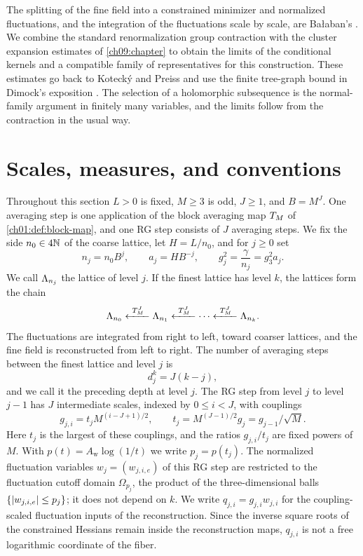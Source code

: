 The splitting of the fine field into a constrained minimizer and normalized fluctuations, and the integration of the fluctuations scale by scale, are Bałaban's \cite{Balaban1985Variational,Balaban1985UV,Balaban1988Convergent}. We combine the standard renormalization group contraction with the cluster expansion estimates of \cref{ch09:chapter} to obtain the limits of the conditional kernels and a compatible family of representatives for this construction. These estimates go back to Kotecký and Preiss \cite{KoteckyPreiss1986} and use the finite tree-graph bound in Dimock's exposition \cite[Appendix~B]{Dimock2013v2}. The selection of a holomorphic subsequence is the normal-family argument in finitely many variables, and the limits follow from the contraction in the usual way.

\section{Scales, measures, and conventions}\label{ch12:sec:setup}

Throughout this section $L>0$ is fixed, $M\ge3$ is odd, $J\ge1$, and $B=M^J$. One averaging step is one application of the block averaging map $T_M$ of \cref{ch01:def:block-map}, and one RG step consists of $J$ averaging steps. We fix the side $n_0\in4\mathbb N$ of the coarse lattice, let $H=L/n_0$, and for $j\ge0$ set
\[
 n_j=n_0B^j,\qquad a_j=HB^{-j},\qquad g_j^2=\frac{\gamma}{n_j}=g_3^2a_j .
\]
We call $\Lambda_{n_j}$ the lattice of level $j$. If the finest lattice has level $k$, the lattices form the chain
\[
 \Lat{n_0}\xleftarrow{\ \Macro\ }\Lat{n_1}\xleftarrow{\ \Macro\ }\cdots
 \xleftarrow{\ \Macro\ }\Lat{n_k}.
\]
The fluctuations are integrated from right to left, toward coarser lattices, and the fine field is reconstructed from left to right. The number of averaging steps between the finest lattice and level $j$ is
\[
 d_j^k=J(k-j),
\]
and we call it the preceding depth at level $j$. The RG step from level $j$ to level $j-1$ has $J$ intermediate scales, indexed by $0\le i<J$, with couplings
\[
 g_{j,i}=t_jM^{(i-J+1)/2},\qquad
 t_j=M^{(J-1)/2}g_j=g_{j-1}/\sqrt M .
\]
Here $t_j$ is the largest of these couplings, and the ratios $g_{j,i}/t_j$ are fixed powers of $M$. With $p(t)=A_{\mathrm w}\log(1/t)$ we write $p_j=p(t_j)$. The normalized fluctuation variables $w_j=(w_{j,i,e})$ of this RG step are restricted to the fluctuation cutoff domain $\Omega_{p_j}$, the product of the three-dimensional balls $\{\lvert w_{j,i,e}\rvert\le p_j\}$; it does not depend on $k$. We write $q_{j,i}=g_{j,i}w_{j,i}$ for the coupling-scaled fluctuation inputs of the reconstruction. Since the inverse square roots of the constrained Hessians remain inside the reconstruction maps, $q_{j,i}$ is not a free logarithmic coordinate of the fiber.

